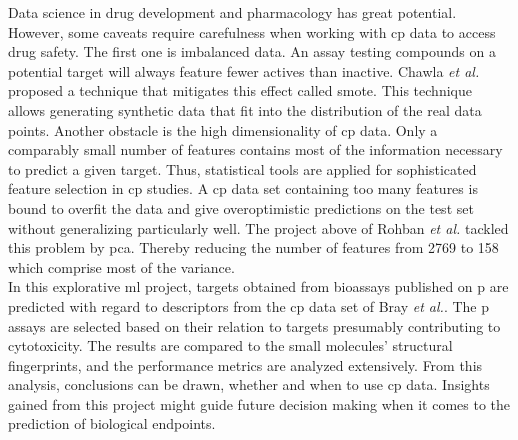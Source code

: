 Data science in drug development and pharmacology has great potential. However, some caveats require carefulness when working with \ac{cp} data to access drug safety. The first one is imbalanced data. An assay testing compounds on a potential target will always feature fewer actives than inactive. Chawla \textit{et al.}\cite{Chawla2002} proposed a technique that mitigates this effect called \ac{smote}. This technique allows generating synthetic data that fit into the distribution of the real data points. Another obstacle is the high dimensionality of \ac{cp} data. Only a comparably small number of features contains most of the information necessary to predict a given target. Thus, statistical tools are applied for sophisticated feature selection in \ac{cp} studies. A \ac{cp} data set containing too many features is bound to overfit the data and give overoptimistic predictions on the test set without generalizing particularly well. The project above of Rohban \textit{et al.}\cite{Rohban2017} tackled this problem by \ac{pca}. Thereby reducing the number of features from \num{2769} to \num{158} which comprise most of the variance.\\
In this explorative \ac{ml} project, targets obtained from bioassays published on \acl{p} are predicted with regard to descriptors from the \ac{cp} data set of Bray \textit{et al.}\cite{Bray2017}. The \acl{p} assays are selected based on their relation to targets presumably contributing to cytotoxicity.\cite{Mervin2016} The results are compared to the small molecules' structural fingerprints, and the performance metrics are analyzed extensively. From this analysis, conclusions can be drawn, whether and when to use \ac{cp} data. Insights gained from this project might guide future decision making when it comes to the prediction of biological endpoints.